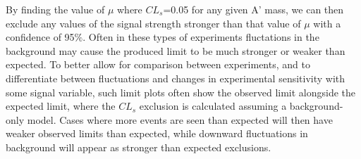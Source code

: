By finding the value of $\mu$ where $CL_s$=0.05 for any given A' mass, we can then exclude any values of the signal strength stronger than that value of $\mu$ with a confidence of 95$\%$. 
Often in these types of experiments fluctations in the background may cause the produced limit to be much stronger or weaker than expected. 
To better allow for comparison between experiments, and to differentiate between fluctuations and changes in experimental sensitivity with some signal variable, such limit plots often show the observed limit alongside the expected limit, where the $CL_s$ exclusion is calculated assuming a background-only model.
Cases where more events are seen than expected will then have weaker observed limits than expected, while downward fluctuations in background will appear as stronger than expected exclusions.

